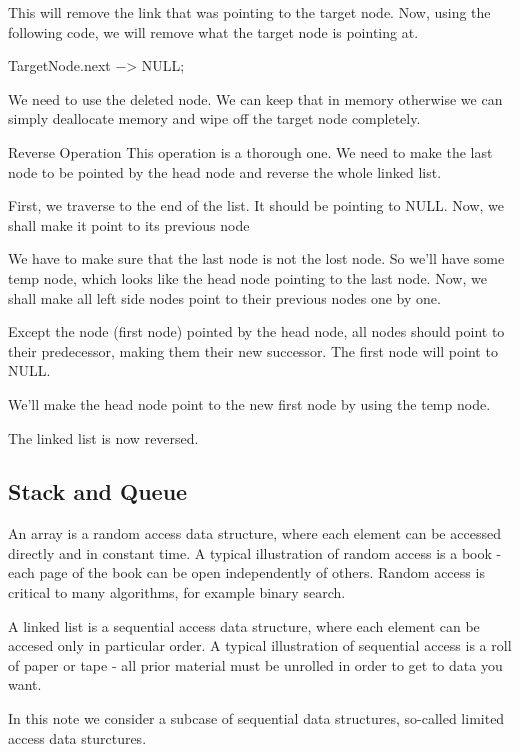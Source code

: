This will remove the link that was pointing to the target node. Now, using the following code, we will remove what the target node is pointing at.

TargetNode.next −> NULL;


We need to use the deleted node. We can keep that in memory otherwise we can simply deallocate memory and wipe off the target node completely.

Reverse Operation
This operation is a thorough one. We need to make the last node to be pointed by the head node and reverse the whole linked list.



First, we traverse to the end of the list. It should be pointing to NULL. Now, we shall make it point to its previous node



We have to make sure that the last node is not the lost node. So we'll have some temp node, which looks like the head node pointing to the last node. Now, we shall make all left side nodes point to their previous nodes one by one.



Except the node (first node) pointed by the head node, all nodes should point to their predecessor, making them their new successor. The first node will point to NULL.



We'll make the head node point to the new first node by using the temp node.



The linked list is now reversed.

\subsection{Stack and Queue}

An array is a random access data structure, where each element can be accessed directly and in constant time. A typical illustration of random access is a book - each page of the book can be open independently of others. Random access is critical to many algorithms, for example binary search.

A linked list is a sequential access data structure, where each element can be accesed only in particular order. A typical illustration of sequential access is a roll of paper or tape - all prior material must be unrolled in order to get to data you want.

In this note we consider a subcase of sequential data structures, so-called limited access data sturctures.


